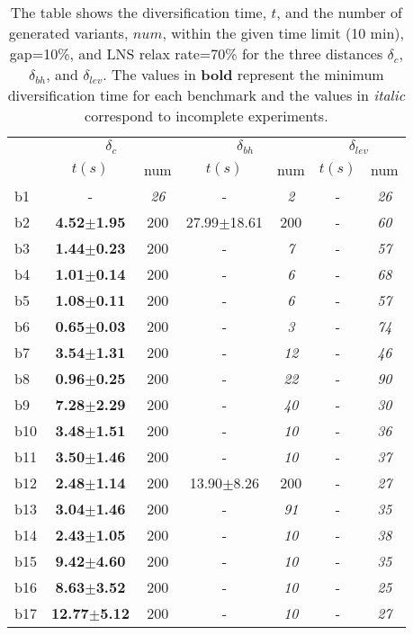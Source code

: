 \begin{longtable}{|l|c|c|c|c|c|c|}
\caption{\label{tab:distances}{The table shows 
		      the diversification time, $t$, and the number of generated
		      variants, $num$, within the given time limit (10 min), gap=10\%,
		      and \ac{LNS} relax rate=70\%
		      for the three distances $\delta_c$, $\delta_{bh}$,
		      and $\delta_{lev}$.
		      The values in  \textbf{bold} represent the minimum 
		      diversification time for each benchmark and the values in \emph{italic} 
		      correspond to incomplete experiments.}}\\
\hline
&\multicolumn{2}{c|}{$\delta_c$}&\multicolumn{2}{c|}{$\delta_{bh}$}&\multicolumn{2}{c|}{$\delta_{lev}$}\\
\cline{2-7}
&$t(s)$&num&$t(s)$&num&$t(s)$&num\\
\hline
b1&- & \textit{26 }&- & \textit{2 }&- & \textit{26 }
\\
b2&\textbf{4.52$\pm$1.95} & 200 &27.99$\pm$18.61 & 200 &- & \textit{60 }
\\
b3&\textbf{1.44$\pm$0.23} & 200 &- & \textit{7 }&- & \textit{57 }
\\
b4&\textbf{1.01$\pm$0.14} & 200 &- & \textit{6 }&- & \textit{68 }
\\
b5&\textbf{1.08$\pm$0.11} & 200 &- & \textit{6 }&- & \textit{57 }
\\
b6&\textbf{0.65$\pm$0.03} & 200 &- & \textit{3 }&- & \textit{74 }
\\
b7&\textbf{3.54$\pm$1.31} & 200 &- & \textit{12 }&- & \textit{46 }
\\
b8&\textbf{0.96$\pm$0.25} & 200 &- & \textit{22 }&- & \textit{90 }
\\
b9&\textbf{7.28$\pm$2.29} & 200 &- & \textit{40 }&- & \textit{30 }
\\
b10&\textbf{3.48$\pm$1.51} & 200 &- & \textit{10 }&- & \textit{36 }
\\
b11&\textbf{3.50$\pm$1.46} & 200 &- & \textit{10 }&- & \textit{37 }
\\
b12&\textbf{2.48$\pm$1.14} & 200 &13.90$\pm$8.26 & 200 &- & \textit{27 }
\\
b13&\textbf{3.04$\pm$1.46} & 200 &- & \textit{91 }&- & \textit{35 }
\\
b14&\textbf{2.43$\pm$1.05} & 200 &- & \textit{10 }&- & \textit{38 }
\\
b15&\textbf{9.42$\pm$4.60} & 200 &- & \textit{10 }&- & \textit{35 }
\\
b16&\textbf{8.63$\pm$3.52} & 200 &- & \textit{10 }&- & \textit{25 }
\\
b17&\textbf{12.77$\pm$5.12} & 200 &- & \textit{10 }&- & \textit{27 }
\\
\hline
\end{longtable}

